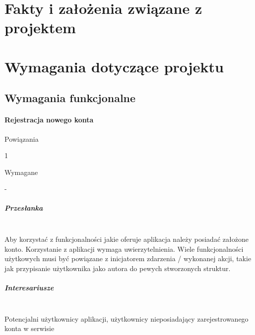 \documentclass[eng,printmode]{mgr}
\begin{document}
\chapter{Fakty i założenia związane z projektem }

\chapter{Wymagania dotyczące projektu}

\section{Wymagania funkcjonalne}

\subsubsection{Rejestracja nowego konta}
\begin{labeling}{Powiązania}
\item [ID:] 1
\item [Typ:] Wymagane
\item [Powiązania] -
\end{labeling}

\paragraph{Przesłanka}\ \\
Aby korzystać z funkcjonalności jakie oferuje aplikacja należy posiadać założone konto. Korzystanie z aplikacji wymaga uwierzytelnienia. Wiele funkcjonalności użytkowych musi być powiązane z inicjatorem zdarzenia / wykonanej akcji, takie jak przypisanie użytkownika jako autora do pewych stworzonych struktur.

\paragraph{Interesariusze}\ \\
Potencjalni użytkownicy aplikacji, użytkownicy nieposiadający zarejestrowanego konta w serwisie
\end{document}
